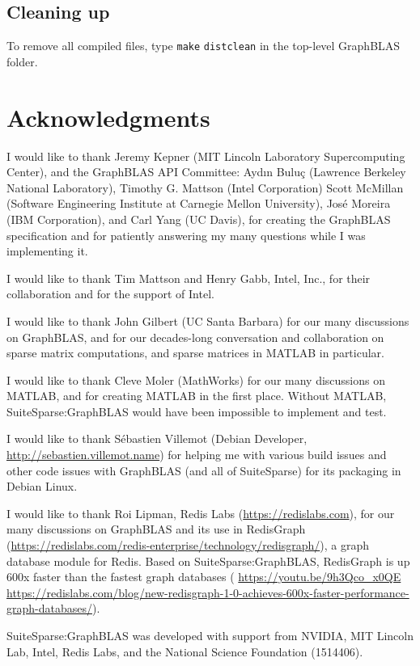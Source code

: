 \documentclass[12pt]{article}
\begin{document}
\subsection{Cleaning up}

To remove all compiled files, type \verb'make' \verb'distclean' in the top-level
GraphBLAS folder.

\newpage
\section{Acknowledgments}

I would like to thank Jeremy Kepner (MIT Lincoln Laboratory Supercomputing
Center), and the GraphBLAS API Committee: Ayd\i n Bulu\c{c} (Lawrence Berkeley
National Laboratory), Timothy G. Mattson (Intel Corporation) Scott McMillan
(Software Engineering Institute at Carnegie Mellon University), Jos\'e Moreira
(IBM Corporation), and Carl Yang (UC Davis), for creating the GraphBLAS
specification and for patiently answering my many questions while I was
implementing it.

I would like to thank Tim Mattson and Henry Gabb, Intel, Inc., for their
collaboration and for the support of Intel.

I would like to thank John Gilbert (UC Santa Barbara) for our many discussions
on GraphBLAS, and for our decades-long conversation and collaboration on sparse
matrix computations, and sparse matrices in MATLAB in particular.

I would like to thank Cleve Moler (MathWorks) for our many discussions on
MATLAB, and for creating MATLAB in the first place.  Without MATLAB,
SuiteSparse:GraphBLAS would have been impossible to implement and test.

I would like to thank S\'ebastien Villemot (Debian Developer,
\url{http://sebastien.villemot.name}) for helping me with various build issues
and other code issues with GraphBLAS (and all of SuiteSparse) for its packaging
in Debian Linux.

I would like to thank Roi Lipman, Redis Labs (\url{https://redislabs.com}), for
our many discussions on GraphBLAS and its use in RedisGraph
(\url{https://redislabs.com/redis-enterprise/technology/redisgraph/}), a graph
database module for Redis.  Based on SuiteSparse:GraphBLAS, RedisGraph is up
600x faster than the fastest graph databases ({\footnotesize
\url{https://youtu.be/9h3Qco_x0QE} \newline
\url{https://redislabs.com/blog/new-redisgraph-1-0-achieves-600x-faster-performance-graph-databases/}}).

SuiteSparse:GraphBLAS was developed with support from
NVIDIA, MIT Lincoln Lab, Intel, Redis Labs, and the National Science
Foundation (1514406).

\newpage
{\small
{}


}
\end{document}
